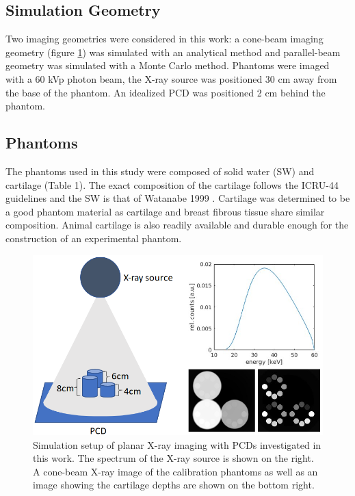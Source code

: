 \documentclass[a4paper,11pt]{article}
\begin{document}
\subsection{Simulation Geometry}

Two imaging geometries were considered in this work: a cone-beam imaging geometry (figure \ref{fig:phantom}) was simulated with an analytical method and parallel-beam geometry was simulated with a Monte Carlo method. Phantoms were imaged with a 60 kVp photon beam, the X-ray source was positioned 30 cm away from the base of the phantom. An idealized PCD was positioned 2 cm behind the phantom.

\subsection{Phantoms}

The phantoms used in this study were composed of solid water (SW) and cartilage (Table 1). The exact composition of the cartilage follows the ICRU-44 \cite{White1989Report44} guidelines and the SW is that of Watanabe 1999 \cite{Watanabe1999DerivationPhotons}. Cartilage was determined to be a good phantom material as cartilage and breast fibrous tissue share similar composition. Animal cartilage is also readily available and durable enough for the construction of an experimental phantom.

\begin{figure}[htbp]
\centering %
\includegraphics[width=\linewidth]{figures/phantoms4.png}
\qquad
\caption{Simulation setup of planar X-ray imaging with PCDs investigated in this work. The spectrum of the X-ray source is shown on the right. A cone-beam X-ray image of the calibration phantoms as well as an image showing the cartilage depths are shown on the bottom right.}
\label{fig:phantom}
\end{figure}
\end{document}
